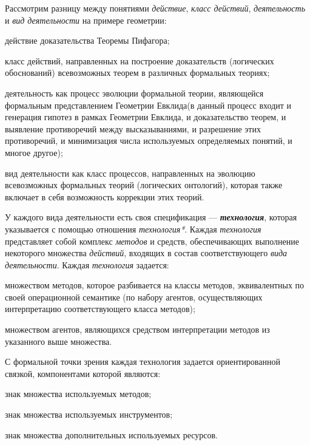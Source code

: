 Рассмотрим разницу между понятиями \textit{действие}, \textit{класс действий}, \textit{деятельность} и \textit{вид деятельности} на примере геометрии:
\begin{textitemize}
	\item действие доказательства Теоремы Пифагора;
	\item класс действий, направленных на построение доказательств (логических обоснований) всевозможных теорем в различных формальных теориях;
	\item деятельность как процесс эволюции формальной теории, являющейся формальным представлением Геометрии Евклида(в данный процесс входит и генерация гипотез в рамках Геометрии Евклида, и доказательство теорем, и выявление противоречий между высказываниями, и разрешение этих противоречий, и минимизация числа используемых определяемых понятий, и многое другое);
	\item вид деятельности как класс процессов, направленных на эволюцию всевозможных формальных теорий (логических онтологий), которая также включает в себя возможность коррекции этих теорий.
\end{textitemize}

У каждого вида деятельности есть своя спецификация --- \textbf{\textit{технология}}, которая указывается с помощью отношения \textit{технология*}. Каждая \textit{технология} представляет собой комплекс \textit{методов} и средств, обеспечивающих выполнение некоторого множества \textit{действий}, входящих в состав соответствующего \textit{вида деятельности}.
Каждая \textit{технология} задается:
\begin{textitemize}
	\item множеством методов, которое разбивается на классы методов, эквивалентных по своей операционной семантике (по набору агентов, осуществляющих интерпретацию соответствующего класса методов);
	\item множеством агентов, являющихся средством интерпретации методов из указанного выше множества.
\end{textitemize}

С формальной точки зрения каждая технология задается ориентированной связкой, компонентами которой являются:
\begin{textitemize}
	\item знак множества используемых методов;
	\item знак множества используемых инструментов;
	\item знак множества дополнительных используемых ресурсов.
\end{textitemize}

